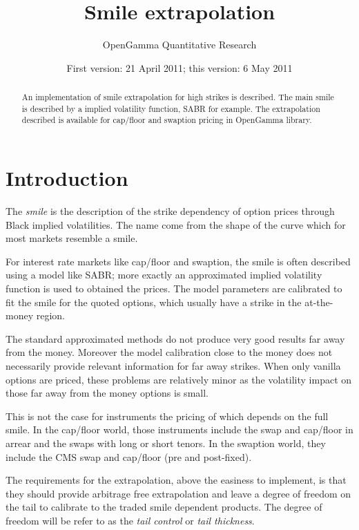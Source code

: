 \documentclass[]{amsart}
\title[Smile extrapolation]%
   {Smile extrapolation}
\author[OpenGamma]%
   {OpenGamma Quantitative Research}
\date{First version: 21 April 2011; this version: 6 May 2011}
\begin{document}
\maketitle

\begin{center}
\end{center}

\begin{abstract}
An implementation of smile extrapolation for high strikes is described. The main smile is described by a implied volatility function, SABR for example. The extrapolation described is available for cap/floor and swaption pricing in OpenGamma library.
\end{abstract}

\section{Introduction}

The \emph{smile} is the description of the strike dependency of option prices through Black implied volatilities. The name come from the shape of the curve which for most markets resemble a smile.

For interest rate markets like cap/floor and swaption, the smile is often described using a model like SABR; more exactly an approximated implied volatility function is used to obtained the prices. The model parameters are calibrated to fit the smile for the quoted options, which usually have a strike in the at-the-money region.

The standard approximated methods do not produce very good results far away from the money. Moreover the model calibration close to the money does not necessarily provide relevant information for far away strikes. When only vanilla options are priced, these problems are relatively minor as the volatility impact on those far away from the money options is small. 

This is not the case for instruments the pricing of which depends on the full smile. In the cap/floor world, those instruments include the swap and cap/floor in arrear and the swaps with long or short tenors. In the swaption world, they include the CMS swap and cap/floor (pre and post-fixed).

The requirements for the extrapolation, above the easiness to implement, is that they should provide arbitrage free extrapolation and leave a degree of freedom on the tail to calibrate to the traded smile dependent products. The degree of freedom will be refer to as the \emph{tail control} or \emph{tail thickness}.
\end{document}
